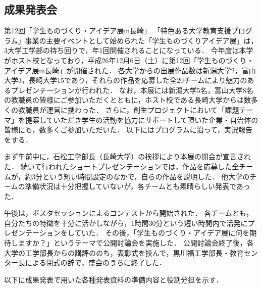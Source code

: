 \subsection{成果発表会}
\par
第12回「学生ものづくり・アイデア展in長崎」
「特色ある大学教育支援プログラム」事業の主要イベントとして始められた「学生ものづくりアイデア展」は，3大学工学部の持ち回りで，年1回開催されることになっている．
今年度は本学がホスト校となっており，平成26年12月6日（土）に第12回「学生ものづくり・アイデア展in長崎」が開催された．
各大学からの出展作品数は新潟大学2，富山大学3，長崎大学15であり，それらの作品を応募した全20チームにより魅力のあるプレゼンテーションが行われた．
なお，本展には新潟大学5名，富山大学8名の教職員の皆様にご参加いただくとともに，ホスト校である長崎大学からは数多くの教職員が運営に携わった．
さらに，創生プロジェクトにおいて「課題テーマ」を提案していただき学生の活動を協力にサポートして頂いた企業・自治体の皆様にも，数多くご参加いただいた．
以下にはプログラムに沿って，実況報告をする．
\par
まず午前中に，石松工学部長（長崎大学）の挨拶により本展の開会が宣言された．
続いて行われたショートプレゼンテーションでは，作品を応募した全チームが，約3分という短い時間設定のなかで，自らの作品を説明した．
他大学のチームの準備状況は十分把握していないが，各チームとも素晴らしい発表であった．
\par
午後は，ポスタセッションによるコンテストから開始された．
各チームとも，自分たちの特徴を十分に活かしながら，1時間30分という短い時間内で活発にプレゼンテーションをしていた．
その後，「学生ものづくり・アイデア展に何を期待しますか？」というテーマで公開討論会を実施した．
公開討論会終了後，各大学の工学部長からの講評ののち，表彰式を挟んで，黒川福工学部長・教育センター長による閉式の辞で，盛会のうちに終了した．
\par
以下に成果発表で用いた各種発表資料の準備内容と役割分担を示す．
